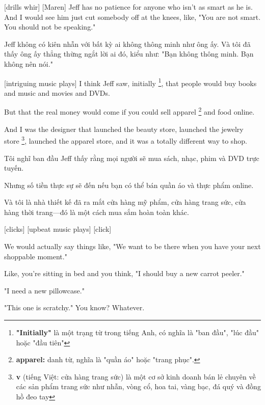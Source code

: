 \documentclass[a4paper]{article}
\begin{document}
	[drills whir]
	[Maren] Jeff has no patience for anyone who isn't as smart as he is.
	And I would see him just cut somebody off at the knees, like, "You are not smart. You should not be speaking."
	
	\begin{vietnamese-v2}
		 Jeff không có kiên nhẫn với bất kỳ ai không thông minh như ông ấy. 
		Và tôi đã thấy ông ấy thẳng thừng ngắt lời ai đó, kiểu như: "Bạn không thông minh. Bạn không nên nói."
	\end{vietnamese-v2}
	
	[intriguing music plays]
	I think Jeff saw, initially \footnote{
		\textbf{"Initially"} là một trạng từ trong tiếng Anh, có nghĩa là "ban đầu", "lúc đầu" hoặc "đầu tiên"
	
	}, that people would buy books and music and movies and DVDs.
	
	But that the real money would come if you could sell apparel \footnote{
		\textbf{apparel:} danh từ, nghĩa là "quần áo" hoặc "trang phục".
	
	} and food online.
	
	And I was the designer that launched the beauty store, launched the jewelry store \footnote{
		\textbf{v} (tiếng Việt: cửa hàng trang sức) là một cơ sở kinh doanh bán lẻ chuyên về các sản phẩm trang sức như nhẫn, vòng cổ, hoa tai, vàng bạc, đá quý và đồng hồ đeo tay
	
	}, launched the apparel store, and it was a totally different way to shop.
	
	\begin{vietnamese-v2}
		 Tôi nghĩ ban đầu Jeff thấy rằng mọi người sẽ mua sách, nhạc, phim và DVD trực tuyến. 
		
		Nhưng số tiền thực sự sẽ đến nếu bạn có thể bán quần áo và thực phẩm online. 
		
		Và tôi là nhà thiết kế đã ra mắt cửa hàng mỹ phẩm, cửa hàng trang sức, cửa hàng thời trang—đó là một cách mua sắm hoàn toàn khác.
	\end{vietnamese-v2}
	
	[clicks]
	[upbeat music plays]
	[click]
	
	We would actually say things like, "We want to be there when you have your next shoppable moment."
	
	Like, you're sitting in bed and you think, "I should buy a new carrot peeler."
	
	"I need a new pillowcase."
	
	"This one is scratchy." You know? Whatever.
	
\end{document}
